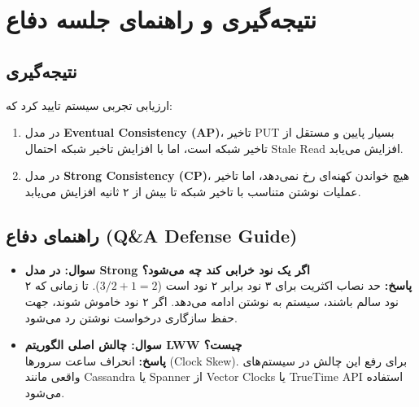 \documentclass[12pt,a4paper]{article}
\begin{document}
\section{نتیجه‌گیری و راهنمای جلسه دفاع}

\subsection{نتیجه‌گیری}
ارزیابی تجربی سیستم تایید کرد که:
\begin{enumerate}
    \item در مدل \textbf{Eventual Consistency (AP)}، تاخیر PUT بسیار پایین و مستقل از تاخیر شبکه است، اما با افزایش تاخیر شبکه احتمال Stale Read افزایش می‌یابد.
    \item در مدل \textbf{Strong Consistency (CP)}، هیچ خواندن کهنه‌ای رخ نمی‌دهد، اما تاخیر عملیات نوشتن متناسب با تاخیر شبکه تا بیش از ۲ ثانیه افزایش می‌یابد.
\end{enumerate}

\subsection{راهنمای دفاع (Q\&A Defense Guide)}
\begin{itemize}
    \item \textbf{سوال: در مدل Strong اگر یک نود خرابی کند چه می‌شود؟}\\
    \textbf{پاسخ:} حد نصاب اکثریت برای ۳ نود برابر ۲ نود است ($3/2 + 1 = 2$). تا زمانی که ۲ نود سالم باشند، سیستم به نوشتن ادامه می‌دهد. اگر ۲ نود خاموش شوند، جهت حفظ سازگاری درخواست نوشتن رد می‌شود.
    \item \textbf{سوال: چالش اصلی الگوریتم LWW چیست؟}\\
    \textbf{پاسخ:} انحراف ساعت سرورها (Clock Skew). برای رفع این چالش در سیستم‌های واقعی مانند Cassandra یا Spanner از Vector Clocks یا TrueTime API استفاده می‌شود.
\end{itemize}
\end{document}
